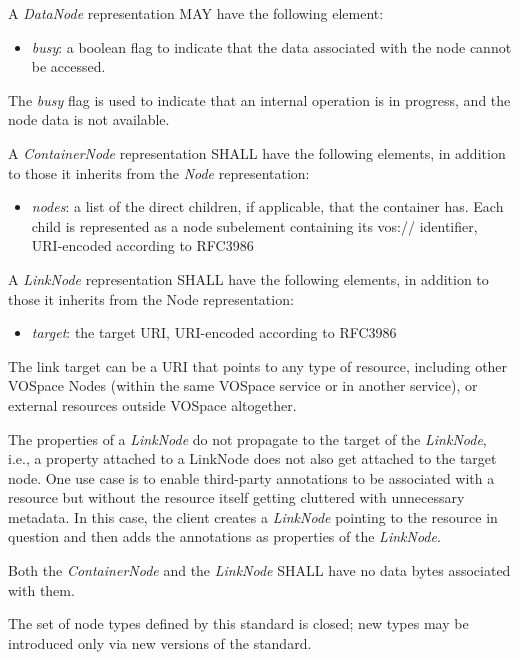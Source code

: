 \documentclass[11pt,a4paper]{ivoa}
\begin{document}
A \emph{DataNode} representation MAY have the following element:

\begin{itemize}
    \item \emph{busy}: a boolean flag to indicate that the data associated with the node cannot be accessed.
\end{itemize}

The \emph{busy} flag is used to indicate that an internal operation is in progress, and the node data is not available.

A \emph{ContainerNode} representation SHALL have the following elements, in addition to those it inherits from the \emph{Node} representation:

\begin{itemize}
    \item \emph{nodes}: a list of the direct children, if applicable, that the container has. Each child is represented as a node subelement containing its vos:// identifier, URI-encoded according to RFC3986 \citep{std:RFC3986}
\end{itemize}

A \emph{LinkNode} representation SHALL have the following elements, in addition to those it inherits from the Node representation:

\begin{itemize}
    \item \emph{target}: the target URI, URI-encoded according to RFC3986 \citep{std:RFC3986}
\end{itemize}

The link target can be a URI that points to any type of resource, including other VOSpace Nodes (within the same VOSpace service or in another service), or external resources outside VOSpace altogether.

The properties of a \emph{LinkNode} do not propagate to the target of the \emph{LinkNode}, i.e., a property attached to a LinkNode does not also get attached to the target node. One use case is to enable third-party annotations to be associated with a resource but without the resource itself getting cluttered with unnecessary metadata. In this case, the client creates a \emph{LinkNode} pointing to the resource in question and then adds the annotations as properties of the \emph{LinkNode}.

Both the \emph{ContainerNode} and the \emph{LinkNode} SHALL have no data bytes associated with them.

The set of node types defined by this standard is closed; new types may be introduced only via new versions of the standard.
\end{document}
